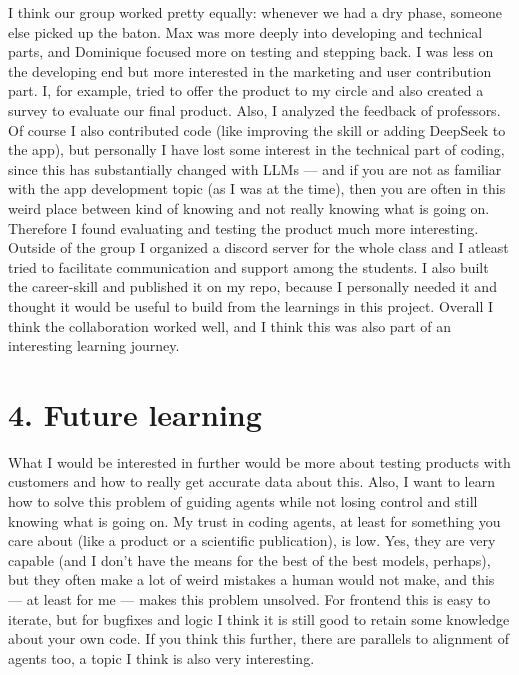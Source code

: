 \documentclass[11pt,a4paper]{article}
\begin{document}
I think our group worked pretty equally: whenever we had a dry phase, someone
else picked up the baton. Max was more deeply into developing and technical
parts, and Dominique focused more on testing and stepping back. I was less on
the developing end but more interested in the marketing and user contribution
part. I, for example, tried to offer the product to my circle and also created a
survey to evaluate our final product. Also, I analyzed the feedback of
professors. Of course I also contributed code (like improving the skill or
adding DeepSeek to the app), but personally I have lost  some interest in the
technical part of coding, since this has substantially changed with LLMs --- and
if you are not as familiar with the app development topic (as I was at the
time), then you are often in this weird place between kind of knowing and not
really knowing what is going on. Therefore I found evaluating and testing the
product much more interesting. Outside of the group I organized a discord server for the whole class and I atleast tried to facilitate communication and support among the students. I  also built the career-skill and published it on my repo, because I personally needed it and thought it would be useful to build from the learnings in this project.
Overall I think the collaboration worked well,
and I think this was also part of an interesting learning journey.

\section*{4. Future learning}

What I would be interested in further would be more about testing products with
customers and how to really get accurate data about this. Also, I want to learn
how to solve this problem of guiding agents while not losing control and still
knowing what is going on. My trust in coding agents, at least for something you
care about (like a product or a scientific publication), is low. Yes, they are
very capable (and I don't have the means for the best of the best models,
perhaps), but they often make a lot of weird mistakes a human would not make,
and this --- at least for me --- makes this problem unsolved. For frontend this
is easy to iterate, but for bugfixes and logic I think it is still good to
retain some knowledge about your own code. If you think this further, there are
parallels to alignment of agents too, a topic I think is also very interesting.
\end{document}
